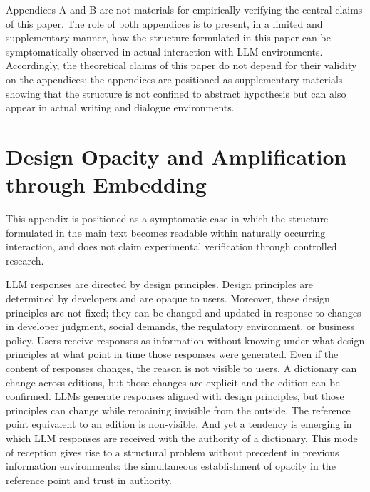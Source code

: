 \documentclass[12pt]{article}
\begin{document}
Appendices A and B are not materials for empirically verifying the central claims of this paper. The role of both appendices is to present, in a limited and supplementary manner, how the structure formulated in this paper can be symptomatically observed in actual interaction with LLM environments. Accordingly, the theoretical claims of this paper do not depend for their validity on the appendices; the appendices are positioned as supplementary materials showing that the structure is not confined to abstract hypothesis but can also appear in actual writing and dialogue environments.

\appendix

\section{Design Opacity and Amplification through Embedding}

This appendix is positioned as a symptomatic case in which the structure formulated in the main text becomes readable within naturally occurring interaction, and does not claim experimental verification through controlled research.

LLM responses are directed by design principles. Design principles are determined by developers and are opaque to users. Moreover, these design principles are not fixed; they can be changed and updated in response to changes in developer judgment, social demands, the regulatory environment, or business policy. Users receive responses as information without knowing under what design principles at what point in time those responses were generated. Even if the content of responses changes, the reason is not visible to users. A dictionary can change across editions, but those changes are explicit and the edition can be confirmed. LLMs generate responses aligned with design principles, but those principles can change while remaining invisible from the outside. The reference point equivalent to an edition is non-visible. And yet a tendency is emerging in which LLM responses are received with the authority of a dictionary. This mode of reception gives rise to a structural problem without precedent in previous information environments: the simultaneous establishment of opacity in the reference point and trust in authority.
\end{document}
